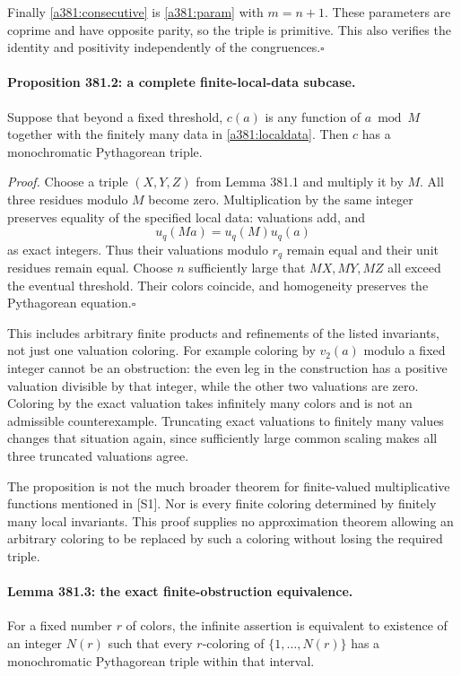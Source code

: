 \documentclass[11pt]{article}
\begin{document}
Finally \eqref{a381:consecutive} is \eqref{a381:param} with $m=n+1$. These parameters are coprime and have opposite parity, so the triple is primitive. This also verifies the identity and positivity independently of the congruences.\hfill$\square$

\paragraph{Proposition 381.2: a complete finite-local-data subcase.}
Suppose that beyond a fixed threshold, $c(a)$ is any function of $a\bmod M$ together with the finitely many data in \eqref{a381:localdata}. Then $c$ has a monochromatic Pythagorean triple.

\emph{Proof.} Choose a triple $(X,Y,Z)$ from Lemma 381.1 and multiply it by $M$. All three residues modulo $M$ become zero. Multiplication by the same integer preserves equality of the specified local data: valuations add, and
\[
                        u_q(Ma)=u_q(M)u_q(a)
\]
as exact integers. Thus their valuations modulo $r_q$ remain equal and their unit residues remain equal. Choose $n$ sufficiently large that $MX,MY,MZ$ all exceed the eventual threshold. Their colors coincide, and homogeneity preserves the Pythagorean equation.\hfill$\square$

This includes arbitrary finite products and refinements of the listed invariants, not just one valuation coloring. For example coloring by $v_2(a)$ modulo a fixed integer cannot be an obstruction: the even leg in the construction has a positive valuation divisible by that integer, while the other two valuations are zero. Coloring by the exact valuation takes infinitely many colors and is not an admissible counterexample. Truncating exact valuations to finitely many values changes that situation again, since sufficiently large common scaling makes all three truncated valuations agree.

The proposition is not the much broader theorem for finite-valued multiplicative functions mentioned in [S1]. Nor is every finite coloring determined by finitely many local invariants. This proof supplies no approximation theorem allowing an arbitrary coloring to be replaced by such a coloring without losing the required triple.

\paragraph{Lemma 381.3: the exact finite-obstruction equivalence.}
For a fixed number $r$ of colors, the infinite assertion is equivalent to existence of an integer $N(r)$ such that every $r$-coloring of $\{1,\ldots,N(r)\}$ has a monochromatic Pythagorean triple within that interval.
\end{document}
